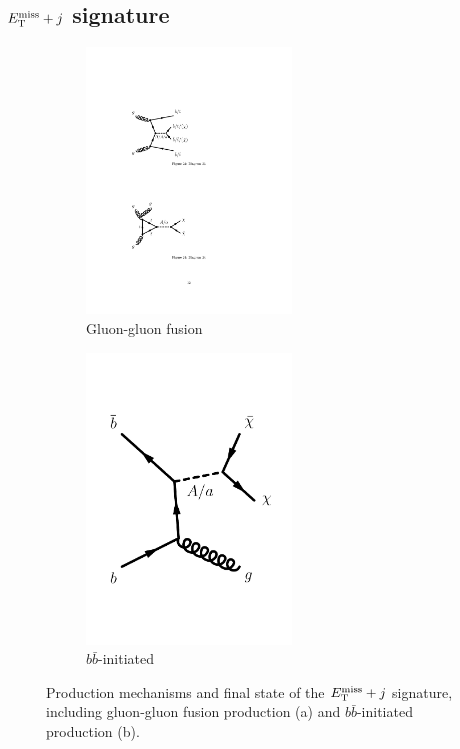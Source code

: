 \subsection{\texorpdfstring{$E_{\mathrm{T}}^{\mathrm{miss}}+j$}{TEXT} signature}
\label{subsect:metj}

\begin{figure}[h!]
    \centering
    \begin{subfigure}[3]{0.48\textwidth}
        \centering
        \includegraphics[width=0.6\textwidth]{figures/fig_01c.pdf}
        \vfill
        \caption{Gluon-gluon fusion}
        \label{subfig:metj-gg-fusion}
    \end{subfigure}
    \hfill
    \begin{subfigure}[3]{0.48\textwidth}
        \centering
        \includegraphics[width=0.6\textwidth]{figures/fig_02e.pdf}
        \caption{$b\bar{b}$-initiated}
        \label{subfig:metj-bb-associated}
    \end{subfigure}
    \caption{Production mechanisms and final state of the $E_{\mathrm{T}}^{\mathrm{miss}}+j$ signature, including gluon-gluon fusion production (a) and $b\bar{b}$-initiated production (b).}
    \label{fig:metj-signature}
\end{figure} 

